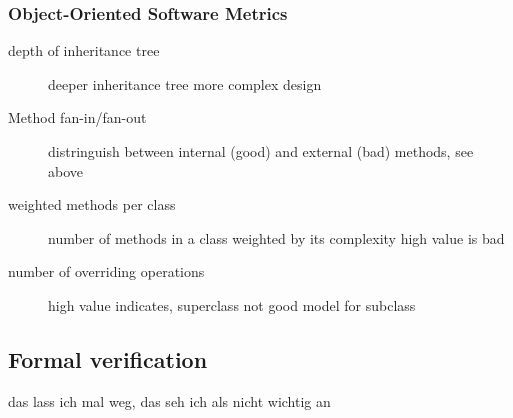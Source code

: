 \documentclass[a4paper, 10pt]{article}
\begin{document}
\subsubsection{Object-Oriented Software Metrics}
\begin{description}
	\item[depth of inheritance tree] deeper inheritance tree \follows more complex design
	\item[Method fan-in/fan-out] distringuish between internal (good) and external (bad) methods, see above
	\item[weighted methods per class] number of methods in a class weighted by its complexity \follows high value is bad
	\item[number of overriding operations] high value indicates, superclass not good model for subclass
\end{description}

\subsection{Formal verification}
das lass ich mal weg, das seh ich als nicht wichtig an
\end{document}
